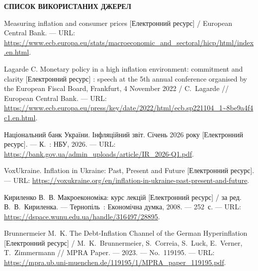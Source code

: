 \documentclass[a4paper,ukrainian,oneside]{extreport}
\begin{document}
\newpage
{}
\begin{center}
    {\bfseries\Large\MakeUppercase{Список використаних джерел}}
\end{center}

\vspace{12pt}

\begin{enumerate}[label={[\arabic*]}, leftmargin=0pt, itemindent=0pt, labelindent=0pt]

\item Measuring inflation and consumer prices [Електронний ресурс] / European Central Bank. --- URL: \url{https://www.ecb.europa.eu/stats/macroeconomic_and_sectoral/hicp/html/index.en.html}.

\item Lagarde C. Monetary policy in a high inflation environment: commitment and clarity [Електронний ресурс] : speech at the 5th annual conference organised by the European Fiscal Board, Frankfurt, 4 November 2022 / C.~Lagarde // European Central Bank. --- URL: \url{https://www.ecb.europa.eu/press/key/date/2022/html/ecb.sp221104_1~8be9a4f4c1.en.html}.

\item Національний банк України. Інфляційний звіт. Січень 2026 року [Електронний ресурс]. --- К.~: НБУ, 2026. --- URL: \url{https://bank.gov.ua/admin_uploads/article/IR_2026-Q1.pdf}.

\item VoxUkraine. Inflation in Ukraine: Past, Present and Future [Електронний ресурс]. --- URL: \url{https://voxukraine.org/en/inflation-in-ukraine-past-present-and-future}.

\item Кириленко В.~В. Макроекономіка: курс лекцій [Електронний ресурс] / за ред. В.~В.~Кириленка. --- Тернопіль~: Економічна думка, 2008. --- 252~с. --- URL: \url{https://dspace.wunu.edu.ua/handle/316497/28895}.

\item Brunnermeier M.~K. The Debt-Inflation Channel of the German Hyperinflation [Електронний ресурс] / M.~K.~Brunnermeier, S.~Correia, S.~Luck, E.~Verner, T.~Zimmermann // MPRA Paper. --- 2023. --- No.~119195. --- URL: \url{https://mpra.ub.uni-muenchen.de/119195/1/MPRA_paper_119195.pdf}.


\end{enumerate}
\end{document}
